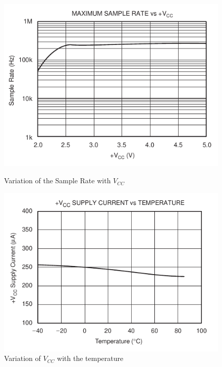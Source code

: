 \documentclass[11pt,a4paper,titlepage]{article}
\begin{document}
							\begin{figure}[htbp]
								\begin{minipage}{.5\textwidth}
									\centering
									\includegraphics[width=\textwidth]{samplerate_vcc.png}
									\caption{Variation of the Sample Rate with $V_{CC}$}
									\label{fig:sample_vcc}
								\end{minipage}
								\begin{minipage}{.5\textwidth}
									\centering
									\includegraphics[width=\textwidth]{VCC_temp.png}
									\caption{Variation of $V_{CC}$ with the temperature}
									\label{fig:vcc_temp}
								\end{minipage}
							\end{figure}
\end{document}
